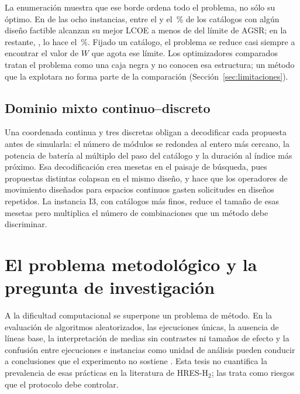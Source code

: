 La enumeración muestra que ese borde ordena todo el problema, no sólo su óptimo. En \BorderCatalogHighCountWord{} de las ocho instancias, entre el \BorderCatalogHighMin{} y el \BorderCatalogHighMax\,\% de los catálogos con algún diseño factible alcanzan su mejor LCOE a menos de \BorderCatalogSlack{} del límite de AGSR; en la restante, \BorderCatalogLowInstance, lo hace el \BorderCatalogLowPct\,\%. Fijado un catálogo, el problema se reduce casi siempre a encontrar el valor de $W$ que agota ese límite. Los optimizadores comparados tratan el problema como una caja negra y no conocen esa estructura; un método que la explotara no forma parte de la comparación (Sección~\ref{sec:limitaciones}).

\subsection{Dominio mixto continuo--discreto}

Una coordenada continua y tres discretas obligan a decodificar cada propuesta antes de simularla: el número de módulos se redondea al entero más cercano, la potencia de batería al múltiplo del paso del catálogo y la duración al índice más próximo. Esa decodificación crea mesetas en el paisaje de búsqueda, pues propuestas distintas colapsan en el mismo diseño, y hace que los operadores de movimiento diseñados para espacios continuos gasten solicitudes en diseños repetidos. La instancia I3, con catálogos más finos, reduce el tamaño de esas mesetas pero multiplica el número de combinaciones que un método debe discriminar.

\section{El problema metodológico y la pregunta de investigación}

A la dificultad computacional se superpone un problema de método. En la evaluación de algoritmos aleatorizados, las ejecuciones únicas, la ausencia de líneas base, la interpretación de medias sin contrastes ni tamaños de efecto y la confusión entre ejecuciones e instancias como unidad de análisis pueden conducir a conclusiones que el experimento no sostiene \cite{Demsar2006Statistical,Derrac2011Tutorial,Arcuri2014Hitchhiker}. Esta tesis no cuantifica la prevalencia de esas prácticas en la literatura de HRES-H$_2$; las trata como riesgos que el protocolo debe controlar.

